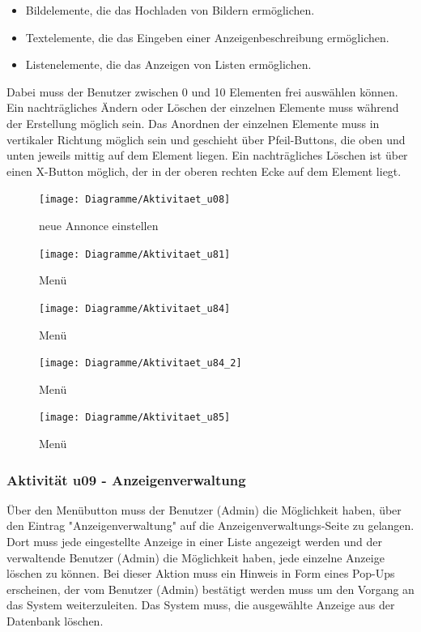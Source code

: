 \documentclass[a4paper,12pt,oneside]{scrartcl}
\begin{document}
\begin{itemize}
	\item Bildelemente, die das Hochladen von Bildern ermöglichen.
	\item Textelemente, die das Eingeben einer Anzeigenbeschreibung ermöglichen.
	\item Listenelemente, die das Anzeigen von Listen ermöglichen.
\end{itemize}
Dabei muss der Benutzer zwischen 0 und 10 Elementen frei auswählen können.
Ein nachträgliches Ändern oder Löschen der einzelnen Elemente muss während der Erstellung möglich sein.
Das Anordnen der einzelnen Elemente muss in vertikaler Richtung möglich sein und geschieht über Pfeil-Buttons, die oben und unten jeweils mittig auf dem Element liegen.
Ein nachträgliches Löschen ist über einen X-Button möglich, der in der oberen rechten Ecke auf dem Element liegt.

\begin{figure}[!htbp]
\centering
\noindent\texttt{[image: Diagramme/Aktivitaet\_u08]}
\caption{neue Annonce einstellen}
\end{figure}
\FloatBarrier

\begin{figure}[!htbp]
\centering
\noindent\texttt{[image: Diagramme/Aktivitaet\_u81]}
\caption{Menü}
\end{figure}
\FloatBarrier

\begin{figure}[!htbp]
\centering
\noindent\texttt{[image: Diagramme/Aktivitaet\_u84]}
\caption{Menü}
\end{figure}
\FloatBarrier

\begin{figure}[!htbp]
\centering
\noindent\texttt{[image: Diagramme/Aktivitaet\_u84\_2]}
\caption{Menü}
\end{figure}
\FloatBarrier

\begin{figure}[!htbp]
\centering
\noindent\texttt{[image: Diagramme/Aktivitaet\_u85]}
\caption{Menü}
\end{figure}
\FloatBarrier

\subsubsection{Aktivität u09 - Anzeigenverwaltung}
Über den Menübutton muss der Benutzer (Admin) die Möglichkeit haben, über den Eintrag "Anzeigenverwaltung" auf die Anzeigenverwaltungs-Seite zu gelangen. 
Dort muss jede eingestellte Anzeige in einer Liste angezeigt werden und der verwaltende Benutzer (Admin) die Möglichkeit haben, jede einzelne Anzeige löschen zu können. 
Bei dieser Aktion muss ein Hinweis in Form eines Pop-Ups erscheinen, der vom Benutzer (Admin) bestätigt werden muss um den Vorgang an das System weiterzuleiten. 
Das System muss, die ausgewählte Anzeige aus der Datenbank löschen.
\end{document}
